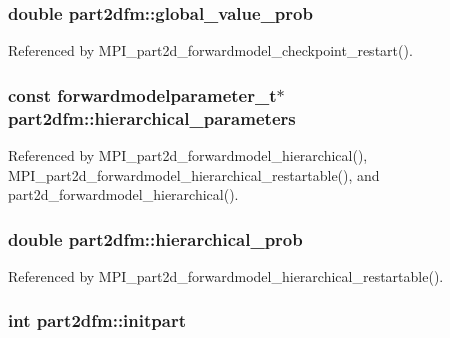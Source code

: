 \subsubsection[{\texorpdfstring{global\+\_\+value\+\_\+prob}{global_value_prob}}]{\setlength{\rightskip}{0pt plus 5cm}double part2dfm\+::global\+\_\+value\+\_\+prob}\hypertarget{structpart2dfm_ad6751334d607033e39894444b680b37b}{}\label{structpart2dfm_ad6751334d607033e39894444b680b37b}


Referenced by M\+P\+I\+\_\+part2d\+\_\+forwardmodel\+\_\+checkpoint\+\_\+restart().

\subsubsection[{\texorpdfstring{hierarchical\+\_\+parameters}{hierarchical_parameters}}]{\setlength{\rightskip}{0pt plus 5cm}const {\bf forwardmodelparameter\+\_\+t}$\ast$ part2dfm\+::hierarchical\+\_\+parameters}\hypertarget{structpart2dfm_ab229f71a3a8bcf91e167836bb6cfe563}{}\label{structpart2dfm_ab229f71a3a8bcf91e167836bb6cfe563}


Referenced by M\+P\+I\+\_\+part2d\+\_\+forwardmodel\+\_\+hierarchical(), M\+P\+I\+\_\+part2d\+\_\+forwardmodel\+\_\+hierarchical\+\_\+restartable(), and part2d\+\_\+forwardmodel\+\_\+hierarchical().

\subsubsection[{\texorpdfstring{hierarchical\+\_\+prob}{hierarchical_prob}}]{\setlength{\rightskip}{0pt plus 5cm}double part2dfm\+::hierarchical\+\_\+prob}\hypertarget{structpart2dfm_abf70bf0a9e6ab23ebf4b616d34742990}{}\label{structpart2dfm_abf70bf0a9e6ab23ebf4b616d34742990}


Referenced by M\+P\+I\+\_\+part2d\+\_\+forwardmodel\+\_\+hierarchical\+\_\+restartable().

\subsubsection[{\texorpdfstring{initpart}{initpart}}]{\setlength{\rightskip}{0pt plus 5cm}int part2dfm\+::initpart}\hypertarget{structpart2dfm_abbefe668a58ae58f174039986929d790}{}\label{structpart2dfm_abbefe668a58ae58f174039986929d790}


